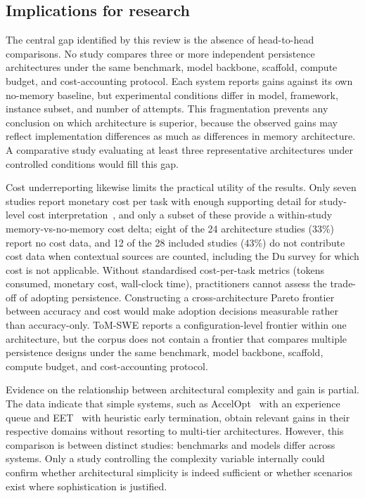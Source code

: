 \subsection{Implications for research}
\label{sec:implicacoes-pesquisa}

The central gap identified by this review is the absence of head-to-head
comparisons.
No study compares three or more independent persistence architectures
under the same benchmark, model backbone, scaffold, compute budget, and
cost-accounting protocol.
Each system reports gains against its own no-memory baseline, but
experimental conditions differ in model, framework, instance subset, and
number of attempts.
This fragmentation prevents any conclusion on which architecture is
superior, because the observed gains may reflect implementation
differences as much as differences in memory architecture.
A comparative study evaluating at least three representative
architectures under controlled conditions would fill this gap.

Cost underreporting likewise limits the practical utility of the
results.
Only seven studies report monetary cost per task with enough
supporting detail for study-level cost
interpretation~\citep{chen2025sweexp,guo2026eet,wang2026memgovern,wu2025gcc,xia2025livesweagent,zhang2025accelopt,zhou2025tomswe},
and only a subset of these provide a within-study memory-vs-no-memory
cost delta;
eight of the 24 architecture studies (33\%) report no cost data, and
12 of the 28 included studies (43\%) do not contribute cost data when
contextual sources are counted, including the Du survey for which cost
is not applicable.
Without standardised cost-per-task metrics (tokens consumed, monetary
cost, wall-clock time), practitioners cannot assess the trade-off of
adopting persistence.
Constructing a cross-architecture Pareto frontier between accuracy and
cost would make adoption decisions measurable rather than accuracy-only.
ToM-SWE reports a configuration-level frontier within one architecture,
but the corpus does not contain a frontier that compares multiple
persistence designs under the same benchmark, model backbone, scaffold,
compute budget, and cost-accounting protocol.

Evidence on the relationship between architectural complexity and gain
is partial.
The data indicate that simple systems, such as
AccelOpt~\citep{zhang2025accelopt} with an experience queue and
EET~\citep{guo2026eet} with heuristic early termination, obtain
relevant gains in their respective domains without resorting to
multi-tier architectures.
However, this comparison is between distinct studies: benchmarks and
models differ across systems.
Only a study controlling the complexity variable internally could
confirm whether architectural simplicity is indeed sufficient or
whether scenarios exist where sophistication is justified.

